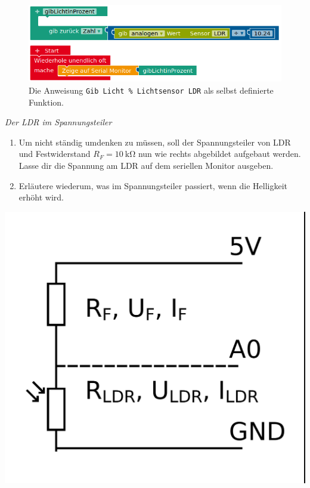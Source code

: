 \begin{figure}[H]
	\centering
	\includegraphics[width=0.7\linewidth]{./pics/gibLichtInProzent-Funktion.png}
	\caption{Die Anweisung \texttt{Gib Licht \% Lichtsensor LDR} als selbst definierte Funktion.}
\end{figure}

\begin{minipage}{0.73\textwidth}
	\begin{aufgabe}\emph{Der LDR im Spannungsteiler}
		\begin{enumerate}[label=\alph*), itemsep=0ex, parsep=0mm]
			\item Um nicht ständig umdenken zu müssen, soll der Spannungsteiler von LDR und Festwiderstand $R_F=\SI{10}{\kilo\ohm}$ nun wie rechts abgebildet aufgebaut werden. Lasse dir die Spannung am LDR auf dem seriellen Monitor ausgeben.
			\item Erläutere wiederum, was im Spannungsteiler passiert, wenn die Helligkeit erhöht wird.
		\end{enumerate}
	\end{aufgabe}
\end{minipage}
\hfill
\begin{minipage}{0.25\textwidth}
	\centering
	\includegraphics[width=\textwidth]{./Zeichnungen/spannungsteiler-ldr-beschriftet.png}
\end{minipage}

